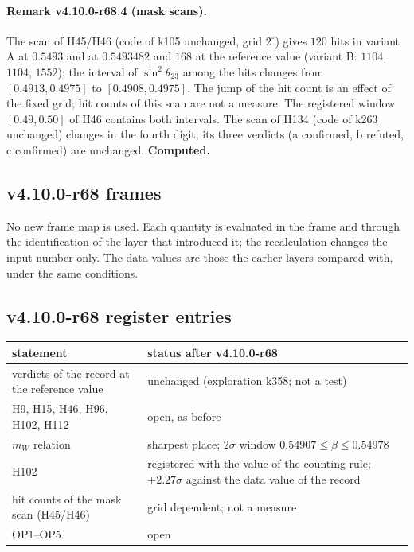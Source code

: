 \paragraph{Remark v4.10.0-r68.4 (mask scans).}
The scan of H45/H46 (code of k105 unchanged, grid \(2^\circ\)) gives \(120\) hits in variant A at \(0.5493\) and at \(0.5493482\) and \(168\)
at the reference value (variant B: \(1104\), \(1104\), \(1552\)); the interval of \(\sin^2\theta_{23}\) among the hits changes from
\([0.4913,0.4975]\) to \([0.4908,0.4975]\).  The jump of the hit count is an effect of the fixed grid; hit counts of this scan are not a
measure.  The registered window \([0.49,0.50]\) of H46 contains both intervals.  The scan of H134 (code of k263 unchanged) changes in the
fourth digit; its three verdicts (a confirmed, b refuted, c confirmed) are unchanged.  \textbf{Computed.}

\subsection*{v4.10.0-r68 frames}
\label{subsec:v4100-r68-frames}

No new frame map is used.  Each quantity is evaluated in the frame and through the identification of the layer that introduced it; the
recalculation changes the input number only.  The data values are those the earlier layers compared with, under the same conditions.

\subsection*{v4.10.0-r68 register entries}
\label{subsec:v4100-r68-register}

\begin{center}
\small
\begin{tabular}{@{}>{\raggedright\arraybackslash}p{}>{\raggedright\arraybackslash}p{}@{}}
\toprule
statement & status after v4.10.0-r68\\
\midrule
verdicts of the record at the reference value & unchanged (exploration k358; not a test)\\
H9, H15, H46, H96, H102, H112 & open, as before\\
\(m_W\) relation & sharpest place; \(2\sigma\) window \(0.54907\le\beta\le0.54978\)\\
H102 & registered with the value of the counting rule; \(+2.27\sigma\) against the data value of the record\\
hit counts of the mask scan (H45/H46) & grid dependent; not a measure\\
OP1--OP5 & open\\
\bottomrule
\end{tabular}
\end{center}

